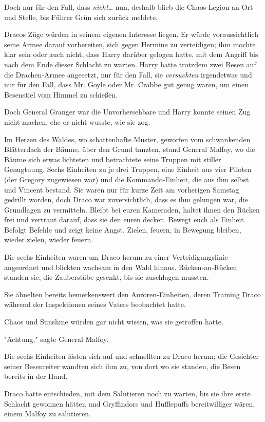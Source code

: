 {Doch nur für den Fall, dass \emph{nicht…} nun, deshalb blieb die Chaos-Legion an Ort und Stelle, bis Führer Grün sich zurück meldete.

Dracos Züge würden in seinem eigenen Interesse liegen. Er würde voraussichtlich seine Armee darauf vorbereiten, sich gegen Hermine zu verteidigen; ihm mochte klar sein oder auch nicht, dass Harry darüber gelogen hatte, mit dem Angriff bis nach dem Ende dieser Schlacht zu warten. Harry hatte trotzdem zwei Besen auf die Drachen-Armee angesetzt, nur für den Fall, sie \emph{versuchten} irgendetwas und nur für den Fall, dass Mr. Goyle oder Mr. Crabbe gut genug waren, um einen Besenstiel vom Himmel zu schießen.

Doch General Granger war die Unvorhersehbare und Harry konnte seinen Zug nicht machen, ehe er nicht wusste, wie sie zog.

\later

Im Herzen des Waldes, wo schattenhafte Muster, geworfen vom schwankenden Blätterdach der Bäume, über den Grund tanzten, stand General Malfoy, wo die Bäume sich etwas lichteten und betrachtete seine Truppen mit stiller Genugtuung. Sechs Einheiten zu je drei Truppen, eine Einheit aus vier Piloten (der Gregory zugewiesen war) und die Kommando-Einheit, die aus ihm selbst und Vincent bestand. Sie waren nur für kurze Zeit am vorherigen Samstag gedrillt worden, doch Draco war zuversichtlich, dass es ihm gelungen war, die Grundlagen zu vermitteln. Bleibt bei euren Kameraden, haltet ihnen den Rücken frei und vertraut darauf, dass sie den euren decken. Bewegt euch als Einheit. Befolgt Befehle und zeigt keine Angst. Zielen, feuern, in Bewegung bleiben, wieder zielen, wieder feuern.

Die sechs Einheiten waren um Draco herum zu einer Verteidigungslinie angeordnet und blickten wachsam in den Wald hinaus. Rücken-an-Rücken standen sie, die Zauberstäbe gesenkt, bis sie zuschlagen mussten.

Sie ähnelten bereits bemerkenswert den Auroren-Einheiten, deren Training Draco während der Inspektionen seines Vaters beobachtet hatte.

Chaos und Sunshine würden gar nicht wissen, was sie getroffen hatte.

"Achtung," sagte General Malfoy.

Die sechs Einheiten lösten sich auf und schnellten zu Draco herum; die Gesichter seiner Besenreiter wandten sich ihm zu, von dort wo sie standen, die Besen bereits in der Hand.

Draco hatte entschieden, mit dem Salutieren noch zu warten, bis sie ihre erste Schlacht gewonnen hätten und Gryffindors und Hufflepuffs bereitwilliger wären, einem Malfoy zu salutieren.

}
